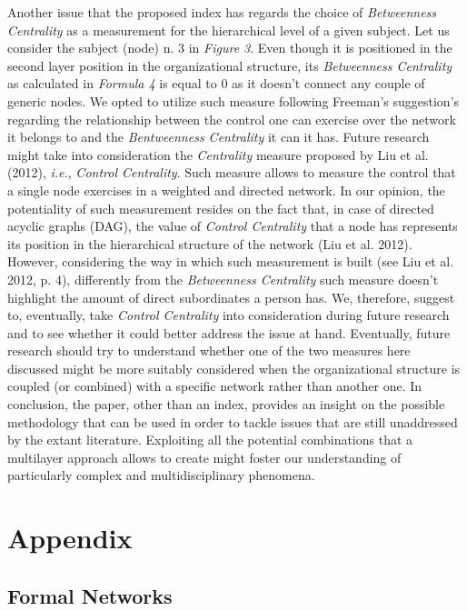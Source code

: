 \documentclass{article}
\begin{document}
Another issue that the proposed index has regards the choice of \emph{Betweenness Centrality} as a measurement for the hierarchical level of a given subject. Let us consider the subject (node) n. 3 in \emph{Figure 3}. Even though it is positioned in the second layer position in the organizational structure, its \emph{Betweenness Centrality} as calculated in \emph{Formula 4} is equal to 0 as it doesn't connect any couple of generic nodes. We opted to utilize such measure following Freeman's suggestion's regarding the relationship between the control one can exercise over the network it belongs to and the \emph{Bentweenness Centrality} it can it has. Future research might take into consideration the \emph{Centrality} measure proposed by Liu et al. (2012), \emph{i.e.}, \emph{Control Centrality}. Such measure allows to measure the control that a single node exercises in a weighted and directed network. In our opinion, the potentiality of such measurement resides on the fact that, in case of directed acyclic graphs (DAG), the value of \emph{Control Centrality} that a node has represents its position in the hierarchical structure of the network (Liu et al. 2012). However, considering the way in which such measurement is built (see Liu et al. 2012, p. 4), differently from the \emph{Betweenness Centrality} such measure doesn't highlight the amount of direct subordinates a person has. We, therefore, suggest to, eventually, take \emph{Control Centrality} into consideration during future research and to see whether it could better address the issue at hand.
Eventually, future research should try to understand whether one of the two measures here discussed might be more suitably considered when the organizational structure is coupled (or combined) with a specific network rather than another one.
In conclusion, the paper, other than an index, provides an insight on the possible methodology that can be used in order to tackle issues that are still unaddressed by the extant literature. Exploiting all the potential combinations that a multilayer approach allows to create might foster our understanding of particularly complex and multidisciplinary phenomena.


\newpage
\section{Appendix}

\subsection{Formal Networks}
\end{document}
